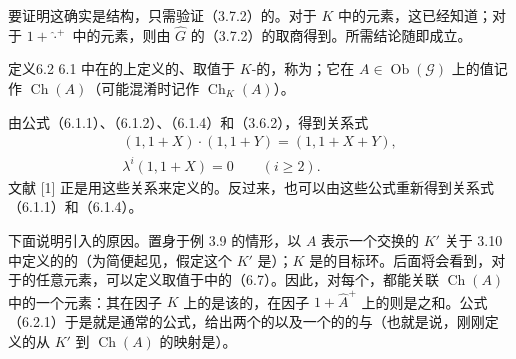 要证明这确实是结构，只需验证（3.7.2）的。对于 $K$ 中的元素，这已经知道；对于 $1+\widehat{\cdot}^{+}$ 中的元素，则由 $\widehat G$ 的（3.7.2）的取商得到。所需结论随即成立。

\begin{SGAresult}{定义}{6.2}
6.1 中在的上定义的、取值于 $K$-的，称为；它在 $A\in\operatorname{Ob}(\mathscr G)$ 上的值记作 $\operatorname{Ch}(A)$（可能混淆时记作 $\operatorname{Ch}_K(A)$）。
\end{SGAresult}
由公式（6.1.1）、（6.1.2）、（6.1.4）和（3.6.2），得到关系式
\[
\begin{gathered}
(1,1+X)\cdot(1,1+Y)=(1,1+X+Y),\\
\lambda^i(1,1+X)=0\qquad(i\geqslant2).
\end{gathered}
\tag{6.2.1}
\]
文献 [1] 正是用这些关系来定义的。反过来，也可以由这些公式重新得到关系式（6.1.1）和（6.1.4）。

下面说明引入的原因。置身于例 3.9 的情形，以 $A$ 表示一个交换的 $K'$ 关于 3.10 中定义的的（为简便起见，假定这个 $K'$ 是）；$K$ 是的目标环。后面将会看到，对于的任意元素，可以定义取值于中的（6.7）。因此，对每个，都能关联 $\operatorname{Ch}(A)$ 中的一个元素：其在因子 $K$ 上的是该的，在因子 $1+\widehat A^+$ 上的则是之和。公式（6.2.1）于是就是通常的公式，给出两个的以及一个的的与（也就是说，刚刚定义的从 $K'$ 到 $\operatorname{Ch}(A)$ 的映射是）。

